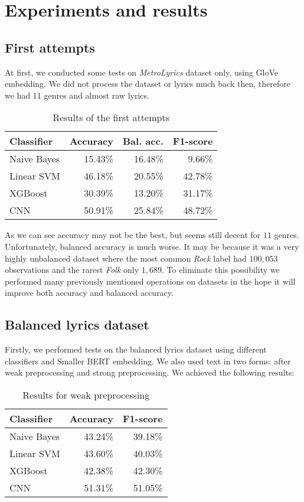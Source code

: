 \section{Experiments and results}\label{experiments}
\subsection{First attempts}
At first, we conducted some tests on \textit{MetroLyrics} dataset only, using GloVe embedding. We did not process the dataset or lyrics much back then, therefore we had 11 genres and almost raw lyrics.

\begin{table}[!h]
\centering
\begin{tabular}{l|r|r|r}
\textbf{Classifier} & \textbf{Accuracy} & \textbf{Bal. acc.} & \textbf{F1-score} \\ \hline
Naive Bayes & 15.43\% & 16.48\% & 9.66\% \\
Linear SVM  & 46.18\% & 20.55\% & 42.78\% \\
XGBoost     & 30.39\% & 13.20\% & 31.17\% \\
CNN         & 50.91\% & 25.84\% & 48.72\%          
\end{tabular}
\caption{Results of the first attempts}
\end{table}

As we can see accuracy may not be the best, but seems still decent for $11$ genres. Unfortunately, balanced accuracy is much worse. It may be because it was a very highly unbalanced dataset where the most common \textit{Rock} label had $100,053$ observations and the rarest \textit{Folk} only $1,689$. To eliminate this possibility we performed many previously mentioned operations on datasets in the hope it will improve both accuracy and balanced accuracy.

\subsection{Balanced lyrics dataset}
Firstly, we performed tests on the balanced lyrics dataset using different classifiers and Smaller BERT embedding. We also used text in two forms: after weak preprocessing and strong preprocessing. We achieved the following results:

\begin{table}[!h]
\centering
\begin{tabular}{l|r|r}
\textbf{Classifier} & \textbf{Accuracy} & \textbf{F1-score} \\ \hline
Naive Bayes         & 43.24\%           & 39.18\%           \\
Linear SVM          & 43.60\%           & 40.03\%           \\
XGBoost             & 42.38\%           & 42.30\%           \\
CNN                 & 51.31\%           & 51.05\%          
\end{tabular}
\caption{Results for weak preprocessing}
\end{table}

